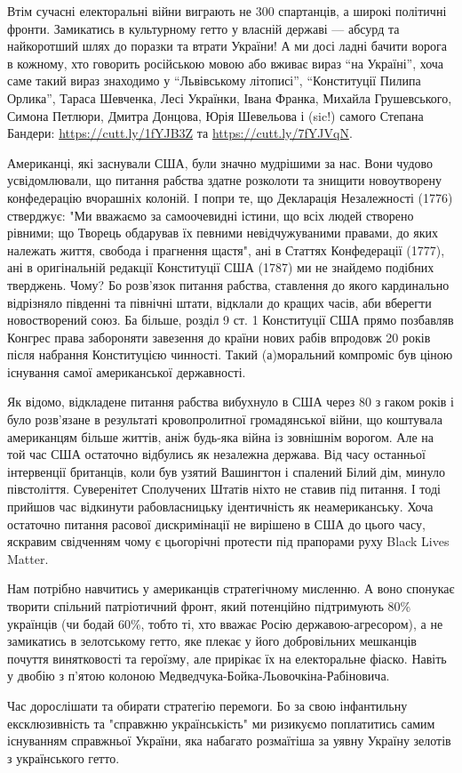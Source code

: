 \begin{itemize}
\begin{multicols}{2}
Втім сучасні електоральні війни виграють не 300 спартанців, а широкі політичні
фронти. Замикатись в культурному гетто у власній державі — абсурд та
найкоротший шлях до поразки та втрати України! А ми досі ладні бачити ворога в
кожному, хто говорить російською мовою або вживає вираз \enquote{на Україні},
хоча саме такий вираз знаходимо у \enquote{Львівському літописі},
\enquote{Конституції Пилипа Орлика}, Тараса Шевченка, Лесі Українки, Івана
Франка, Михайла Грушевського, Симона Петлюри, Дмитра Донцова, Юрія Шевельова і
(sic!) самого Степана Бандери: \url{https://cutt.ly/1fYJB3Z} та
\url{https://cutt.ly/7fYJVqN}.

Американці, які заснували США, були значно мудрішими за нас. Вони чудово
усвідомлювали, що питання рабства здатне розколоти та знищити новоутворену
конфедерацію вчорашніх колоній. І попри те, що Декларація Незалежності (1776)
стверджує: "Ми вважаємо за самоочевидні істини, що всіх людей створено рівними;
що Творець обдарував їх певними невідчужуваними правами, до яких належать
життя, свобода і прагнення щастя", ані в Статтях Конфедерації (1777), ані в
оригінальній редакції Конституції США (1787) ми не знайдемо подібних тверджень.
Чому? Бо розв’язок питання рабства, ставлення до якого кардинально відрізняло
південні та північні штати, відклали до кращих часів, аби вберегти
новостворений союз. Ба більше, розділ 9 ст. 1 Конституції США прямо позбавляв
Конгрес права забороняти завезення до країни нових рабів впродовж 20 років
після набрання Конституцією чинності. Такий (а)моральний компроміс був ціною
існування самої американської державності.

Як відомо, відкладене питання рабства вибухнуло в США через 80 з гаком років і
було розв’язане в результаті кровопролитної громадянської війни, що коштувала
американцям більше життів, аніж будь-яка війна із зовнішнім ворогом. Але на той
час США остаточно відбулись як незалежна держава. Від часу останньої
інтервенції британців, коли був узятий Вашингтон і спалений Білий дім, минуло
півстоліття. Суверенітет Сполучених Штатів ніхто не ставив під питання. І тоді
прийшов час відкинути рабовласницьку ідентичність як неамериканську. Хоча
остаточно питання расової дискримінації не вирішено в США до цього часу,
яскравим свідченням чому є цьогорічні протести під прапорами руху Black Lives
Matter.

Нам потрібно навчитись у американців стратегічному мисленню. А воно спонукає
творити спільний патріотичний фронт, який потенційно підтримують 80\% українців
(чи бодай 60\%, тобто ті, хто вважає Росію державою-агресором), а не замикатись
в зелотському гетто, яке плекає у його добровільних мешканців почуття
винятковості та героїзму, але прирікає їх на електоральне фіаско. Навіть у
двобію з п’ятою колоною Медведчука-Бойка-Льовочкіна-Рабіновича.

Час дорослішати та обирати стратегію перемоги. Бо за свою інфантильну
ексклюзивність та "справжню українськість" ми ризикуємо поплатитись самим
існуванням справжньої України, яка набагато розмаїтіша за уявну Україну зелотів
з українського гетто.

\end{multicols}

\end{itemize} %
